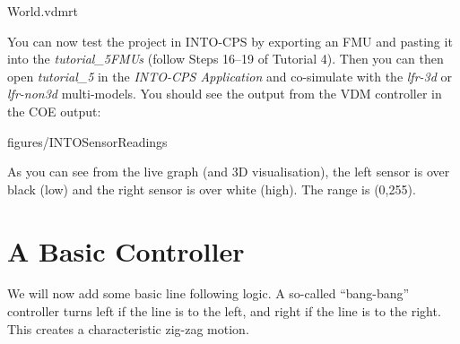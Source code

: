 \documentclass[11pt,a4paper]{../tutorial}
\begin{document}
\begin{instructions}
    \bigskip
    
    {World.vdmrt}

\item You can now test the project in INTO-CPS by exporting an FMU and pasting it into the \emph{tutorial\_5\pathsep{}FMUs} (follow Steps 16--19 of Tutorial 4). Then you can then open \emph{tutorial\_5} in the \emph{INTO-CPS Application} and co-simulate with the \emph{lfr-3d} or \emph{lfr-non3d} multi-models. You should see the output from the VDM controller in the COE output:

    \begin{annotation}[width=0.99\linewidth,trim=0 70 0 0,clip]{figures/INTOSensorReadings}
    \end{annotation}

    As you can see from the live graph (and 3D visualisation), the left sensor is over black (low) and the right sensor is over white (high). The range is (0,255).

\end{instructions}

\newpage
\section{A Basic Controller}

We will now add some basic line following logic. A so-called ``bang-bang'' controller turns left if the line is to the left, and right if the line is to the right. This creates a characteristic zig-zag motion.
\end{document}
